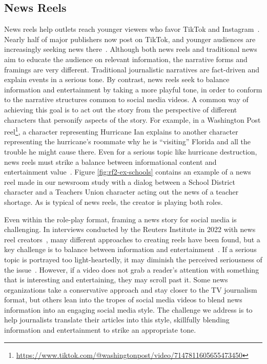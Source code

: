 \subsection{News Reels}

News reels help outlets reach younger viewers who favor TikTok and Instagram~\cite{newman_news_tt_reuters_oxford}. Nearly half of major publishers now post on TikTok, and younger audiences are increasingly seeking news there~\cite{newman_digital_news_2022}.
Although both news reels and traditional news aim to educate the audience on relevant information, the narrative forms and framings are very different. 
Traditional journalistic narratives are fact-driven and explain events in a serious tone. 
By contrast, news reels seek to balance information and entertainment by taking a more playful tone, in order to conform to the narrative structures common to social media videos.  
A common way of achieving this goal is to act out the story from the perspective of different characters that personify aspects of the story. 
For example, in a Washington Post reel\footnote{\url{https://www.tiktok.com/@washingtonpost/video/7147811605655473450}}, a character representing Hurricane Ian explains to another character representing the hurricane’s roommate why he is “visiting” Florida and all the trouble he might cause there. 
Even for a serious topic like hurricane destruction, news reels must strike a balance between informational content and entertainment value~\cite{newman_news_tt_reuters_oxford}. 
Figure \ref{fig:rf2-ex-schools} contains an example of a news reel made in our newsroom study with a dialog between a School District character and a Teachers Union character acting out the news of a teacher shortage. 
As is typical of news reels, the creator is playing both roles.

Even within the role-play format, framing a news story for social media is challenging. 
In interviews conducted by the Reuters Institute in 2022 with
news reel creators~\cite{newman_news_tt_reuters_oxford}, many different approaches to creating reels
have been found, but a key challenge is to balance between information
and entertainment~\cite{newman_news_tt_reuters_oxford}. 
If a serious topic is portrayed too light-heartedly, it may diminish the perceived seriousness of the issue~\cite{davis2022infotainment}.
However, if a video does not grab a reader’s attention with something that is interesting and entertaining, they may scroll past it. 
Some news organizations take a conservative approach and stay closer to the TV journalism format, but others lean into the tropes of social media videos to blend news information into an engaging social media style. 
The challenge we address is to help journalists
translate their articles into this style, skillfully blending information and entertainment to strike an appropriate tone.


